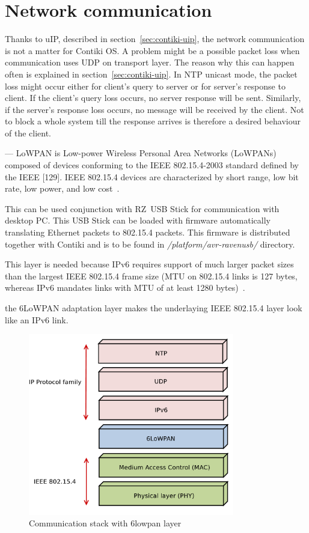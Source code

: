 
\section{Network communication}
Thanks to uIP, described in section~\ref{sec:contiki-uip},
the network communication is not a matter for Contiki OS.
A problem might be a possible packet loss when communication uses UDP on transport layer.
The reason why this can happen often is explained in section~\ref{sec:contiki-uip}.
In NTP unicast mode, the packet loss might occur either for client's query to server
or for server's response to client.
If the client's query loss occurs, no server response will be sent.
Similarly, if the server's response loss occurs, no message will be received by the client.
Not to block a whole system till the response arrives
is therefore a desired behaviour of the client.



---
LoWPAN is Low-power Wireless Personal Area
Networks (LoWPANs) composed of devices conforming to the IEEE 802.15.4-2003 standard defined
by the IEEE [129]. IEEE 802.15.4 devices are characterized by short range, low bit rate, low power,
and low cost~\cite{interconnecting}.

This can be used conjunction with RZ~USB Stick for communication with desktop PC.
This USB Stick can be loaded with firmware automatically translating
Ethernet packets to 802.15.4 packets.
This firmware is distributed together with Contiki and
is to be found in {\it{/platform/avr-ravenusb/}} directory.

This layer is needed because IPv6 requires support of much larger packet
sizes than the largest IEEE 802.15.4 frame size
(MTU on 802.15.4 links is 127 bytes,
whereas IPv6 mandates links with MTU of at least 1280 bytes)~\cite{interconnecting}.


the 6LoWPAN adaptation layer makes the underlaying IEEE 802.15.4 layer look like an IPv6 link.
\begin{figure}
  \centering
  \includegraphics[width=9cm,keepaspectratio]{fig/6lowpan.pdf}
  \caption{Communication stack with 6lowpan layer}
  \label{fig:design-6lowpan}
  \bigskip
\end{figure}


